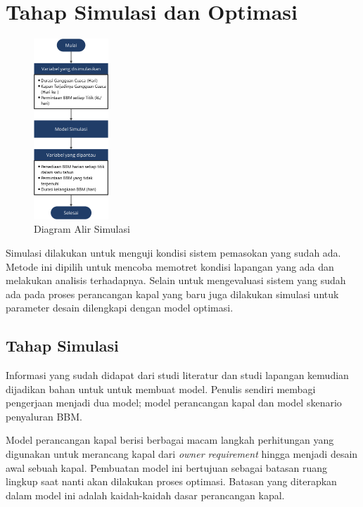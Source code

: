 \section{Tahap Simulasi dan Optimasi}
\label{sec:tahap-simulasi-optimasi}

\begin{figure}[!ht]
    \centering
    \includegraphics[width=0.25\textwidth]{gambar/FC_Simul.png}
    \caption{Diagram Alir Simulasi}
    \label{fig:flowchart-simulasi}
\end{figure}

Simulasi dilakukan untuk menguji kondisi sistem pemasokan yang sudah ada. Metode ini dipilih untuk mencoba memotret kondisi lapangan yang ada dan melakukan analisis terhadapnya. Selain untuk mengevaluasi sistem yang sudah ada pada proses perancangan kapal yang baru juga dilakukan simulasi untuk parameter desain dilengkapi dengan model optimasi.

\subsection{Tahap Simulasi}
\label{subsec:tahap-simulasi}

    Informasi yang sudah didapat dari studi literatur dan studi lapangan kemudian dijadikan bahan untuk untuk membuat model. Penulis sendiri membagi pengerjaan menjadi dua model; model perancangan kapal dan model skenario penyaluran BBM.

    Model perancangan kapal berisi berbagai macam langkah perhitungan yang digunakan untuk merancang kapal dari \emph{owner requirement} hingga menjadi desain awal sebuah kapal. Pembuatan model ini bertujuan sebagai batasan ruang lingkup saat nanti akan dilakukan proses optimasi. Batasan yang diterapkan dalam model ini adalah kaidah-kaidah dasar perancangan kapal.

